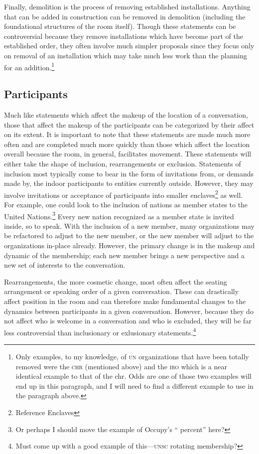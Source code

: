 \documentclass{article}
\begin{document}
Finally, demolition is the process of removing established installations.
Anything that can be added in construction can be removed in demolition (including the foundational structures of the room itself).
Though these statements can be controversial because they remove installations which have become part of the established order, they often involve much simpler proposals since they focus only on removal of an installation which may take much less work than the planning for an addition.\footnote{Only examples, to my knowledge, of \textsc{un} organizations that have been totally removed were the \textsc{chr} (mentioned above) and the \textsc{iro} which is a near identical example to that of the chr. Odds are one of those two examples will end up in this paragraph, and I will need to find a different example to use in the paragraph above.}

\subsection{Participants}
Much like statements which affect the makeup of the location of a conversation, those that affect the makeup of the participants can be categorized by their affect on its extent.
It is important to note that these statements are made much more often and are completed much more quickly than those which affect the location overall because the room, in general, facilitates movement.
These statements will either take the shape of inclusion, rearrangements or exclusion.
Statements of inclusion most typically come to bear in the form of invitations from, or demands made by, the indoor participants to entities currently outside.
However, they may involve invitations or acceptance of participants into smaller enclaves\footnote{Reference Enclaves} as well.
For example, one could look to the inclusion of nations as member states to the United Nations.\footnote{Or perhaps I should move the example of Occupy's `` percent'' here?}
Every new nation recognized as a member state is invited inside, so to speak.
With the inclusion of a new member, many organizations may be refactored to adjust to the new member, or the new member will adjust to the organizations in-place already.
However, the primary change is in the makeup and dynamic of the membership; each new member brings a new perspective and a new set of interests to the conversation.

Rearrangements, the more cosmetic change, most often affect the seating arrangement or speaking order of a given conversation.
These can drastically affect position in the room and can therefore make fundamental changes to the dynamics between participants in a given conversation.
However, because they do not affect who is welcome in a conversation and who is excluded, they will be far less controversial than inclusionary or exlusionary statements.\footnote{Must come up with a good example of this---\textsc{unsc} rotating membership?}
\end{document}
